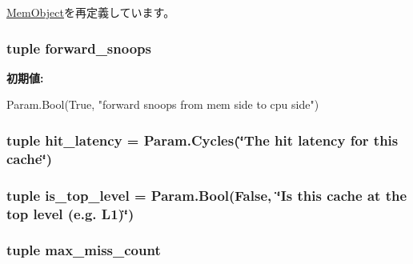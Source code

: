 \hyperlink{classMemObject_1_1MemObject_a17da7064bc5c518791f0c891eff05fda}{MemObject}を再定義しています。\hypertarget{classBaseCache_1_1BaseCache_a76c2c133c0ca2454e00f406cd8368eeb}{
\subsubsection[{forward\_\-snoops}]{\setlength{\rightskip}{0pt plus 5cm}tuple {\bf forward\_\-snoops}}}
\label{classBaseCache_1_1BaseCache_a76c2c133c0ca2454e00f406cd8368eeb}
{\bfseries 初期値:}
\begin{DoxyCode}
Param.Bool(True,
        "forward snoops from mem side to cpu side")
\end{DoxyCode}
\hypertarget{classBaseCache_1_1BaseCache_a436a0fbcd55f5b33c39cb0e4b6898d0e}{
\subsubsection[{hit\_\-latency}]{\setlength{\rightskip}{0pt plus 5cm}tuple {\bf hit\_\-latency} = Param.Cycles(\char`\"{}The hit latency for this cache\char`\"{})}}
\label{classBaseCache_1_1BaseCache_a436a0fbcd55f5b33c39cb0e4b6898d0e}
\hypertarget{classBaseCache_1_1BaseCache_ad7fc27036bf98b9b662ad9992833b458}{
\subsubsection[{is\_\-top\_\-level}]{\setlength{\rightskip}{0pt plus 5cm}tuple {\bf is\_\-top\_\-level} = Param.Bool(False, \char`\"{}Is this cache at the top level (e.g. L1)\char`\"{})}}
\label{classBaseCache_1_1BaseCache_ad7fc27036bf98b9b662ad9992833b458}
\hypertarget{classBaseCache_1_1BaseCache_a51e99500c857b9a43def7df123f04211}{
\subsubsection[{max\_\-miss\_\-count}]{\setlength{\rightskip}{0pt plus 5cm}tuple {\bf max\_\-miss\_\-count}}}
